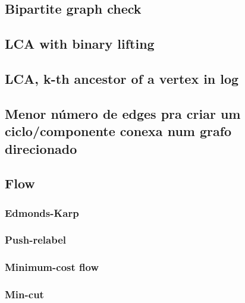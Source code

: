 \subsection{Bipartite graph check}


\subsection{LCA with binary lifting}


\subsection{LCA, k-th ancestor of a vertex in log}


\subsection{Menor número de edges pra criar um ciclo/componente conexa num grafo direcionado}


\subsection{Flow}

\subsubsection{Edmonds-Karp}


\subsubsection{Push-relabel}


\subsubsection{Minimum-cost flow}


\subsubsection{Min-cut}

